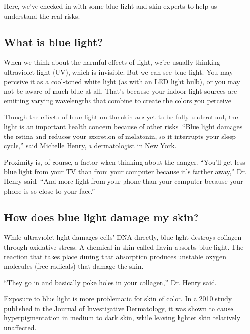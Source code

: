 Here, we've checked in with some blue light and skin experts to help us
understand the real risks.

\hypertarget{what-is-blue-light}{%
\subsection{What is blue light?}\label{what-is-blue-light}}

When we think about the harmful effects of light, we're usually thinking
ultraviolet light (UV), which is invisible. But we can see blue light.
You may perceive it as a cool-toned white light (as with an LED light
bulb), or you may not be aware of much blue at all. That's because your
indoor light sources are emitting varying wavelengths that combine to
create the colors you perceive.

Though the effects of blue light on the skin are yet to be fully
understood, the light is an important health concern because of other
risks. ``Blue light damages the retina and reduces your excretion of
melatonin, so it interrupts your sleep cycle,'' said Michelle Henry, a
dermatologist in New York.

Proximity is, of course, a factor when thinking about the danger.
``You'll get less blue light from your TV than from your computer
because it's farther away,'' Dr. Henry said. ``And more light from your
phone than your computer because your phone is so close to your face.''

\hypertarget{how-does-blue-light-damage-my-skin}{%
\subsection{How does blue light damage my
skin?}\label{how-does-blue-light-damage-my-skin}}

While ultraviolet light damages cells' DNA directly, blue light destroys
collagen through oxidative stress. A chemical in skin called flavin
absorbs blue light. The reaction that takes place during that absorption
produces unstable oxygen molecules (free radicals) that damage the skin.

``They go in and basically poke holes in your collagen,'' Dr. Henry
said.

Exposure to blue light is more problematic for skin of color. In
\href{https://www.sciencedirect.com/science/article/pii/S0022202X15349307}{a
2010 study published in the Journal of Investigative Dermatology}, it
was shown to cause hyperpigmentation in medium to dark skin, while
leaving lighter skin relatively unaffected.

